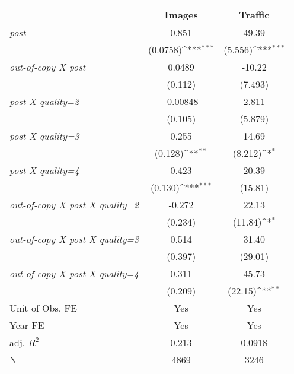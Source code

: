 {
\def\sym#1{\ifmmode^{#1}\else\(^{#1}\)\fi}
\begin{tabular*}{\hsize}{@{\hskip\tabcolsep\extracolsep\fill}l*{2}{c}}
\toprule
            &\multicolumn{1}{c}{Images}&\multicolumn{1}{c}{Traffic}\\
\midrule
\emph{post} &       0.851         &       49.39         \\
            &    (0.0758)\sym{***}&     (5.556)\sym{***}\\
\addlinespace
\emph{out-of-copy X post}&      0.0489         &      -10.22         \\
            &     (0.112)         &     (7.493)         \\
\addlinespace
\emph{post X quality=2}&    -0.00848         &       2.811         \\
            &     (0.105)         &     (5.879)         \\
\addlinespace
\emph{post X quality=3}&       0.255         &       14.69         \\
            &     (0.128)\sym{**} &     (8.212)\sym{*}  \\
\addlinespace
\emph{post X quality=4}&       0.423         &       20.39         \\
            &     (0.130)\sym{***}&     (15.81)         \\
\addlinespace
\emph{out-of-copy X post X quality=2}&      -0.272         &       22.13         \\
            &     (0.234)         &     (11.84)\sym{*}  \\
\addlinespace
\emph{out-of-copy X post X quality=3}&       0.514         &       31.40         \\
            &     (0.397)         &     (29.01)         \\
\addlinespace
\emph{out-of-copy X post X quality=4}&       0.311         &       45.73         \\
            &     (0.209)         &     (22.15)\sym{**} \\
\midrule
Unit of Obs. FE&         Yes         &         Yes         \\
Year FE     &         Yes         &         Yes         \\
adj. $R^2$  &       0.213         &      0.0918         \\
N           &        4869         &        3246         \\
\bottomrule
\end{tabular*}
}
